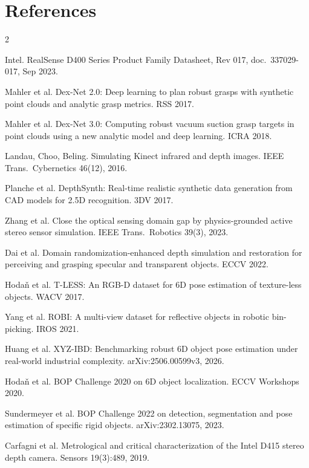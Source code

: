 \documentclass[10pt,a4paper]{article}
\begin{document}
{\footnotesize
\section*{References}
\vspace{-3pt}
\begin{multicols}{2}
\setlength{\parskip}{0.6pt}
\begin{enumerate}[leftmargin=1.7em,label={[\arabic*]},itemsep=0.4pt,topsep=0pt]
\item Intel. RealSense D400 Series Product Family Datasheet, Rev 017, doc.\ 337029-017, Sep 2023.
\item Mahler et al. Dex-Net 2.0: Deep learning to plan robust grasps with synthetic point clouds and analytic grasp metrics. RSS 2017.
\item Mahler et al. Dex-Net 3.0: Computing robust vacuum suction grasp targets in point clouds using a new analytic model and deep learning. ICRA 2018.
\item Landau, Choo, Beling. Simulating Kinect infrared and depth images. IEEE Trans.\ Cybernetics 46(12), 2016.
\item Planche et al. DepthSynth: Real-time realistic synthetic data generation from CAD models for 2.5D recognition. 3DV 2017.
\item Zhang et al. Close the optical sensing domain gap by physics-grounded active stereo sensor simulation. IEEE Trans.\ Robotics 39(3), 2023.
\item Dai et al. Domain randomization-enhanced depth simulation and restoration for perceiving and grasping specular and transparent objects. ECCV 2022.
\item Hodaň et al. T-LESS: An RGB-D dataset for 6D pose estimation of texture-less objects. WACV 2017.
\item Yang et al. ROBI: A multi-view dataset for reflective objects in robotic bin-picking. IROS 2021.
\item Huang et al. XYZ-IBD: Benchmarking robust 6D object pose estimation under real-world industrial complexity. arXiv:2506.00599v3, 2026.
\item Hodaň et al. BOP Challenge 2020 on 6D object localization. ECCV Workshops 2020.
\item Sundermeyer et al. BOP Challenge 2022 on detection, segmentation and pose estimation of specific rigid objects. arXiv:2302.13075, 2023.
\item Carfagni et al. Metrological and critical characterization of the Intel D415 stereo depth camera. Sensors 19(3):489, 2019.

\end{enumerate}
\end{multicols}}
\end{document}
